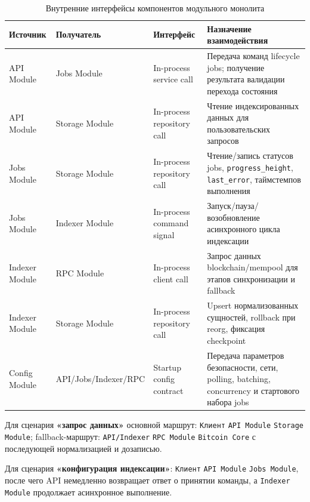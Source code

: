 ﻿\documentclass[14pt,a4paper]{extarticle}
\begin{document}
\begin{table}[H]
\centering
\begin{tabular}{p{} p{} p{} p{}}
\toprule
Источник & Получатель & Интерфейс & Назначение взаимодействия \\
\midrule
API Module & Jobs Module & In-process service call & Передача команд lifecycle jobs; получение результата валидации перехода состояния \\
\midrule
API Module & Storage Module & In-process repository call & Чтение индексированных данных для пользовательских запросов \\
\midrule
Jobs Module & Storage Module & In-process repository call & Чтение/запись статусов jobs, \texttt{progress\_height}, \texttt{last\_error}, таймстемпов выполнения \\
\midrule
Jobs Module & Indexer Module & In-process command signal & Запуск/пауза/возобновление асинхронного цикла индексации \\
\midrule
Indexer Module & RPC Module & In-process client call & Запрос данных blockchain/mempool для этапов синхронизации и fallback \\
\midrule
Indexer Module & Storage Module & In-process repository call & Upsert нормализованных сущностей, rollback при reorg, фиксация checkpoint \\
\midrule
Config Module & API/Jobs/Indexer/RPC & Startup config contract & Передача параметров безопасности, сети, polling, batching, concurrency и стартового набора jobs \\
\bottomrule
\end{tabular}
\caption{Внутренние интерфейсы компонентов модульного монолита}
\end{table}

\noindent Для сценария \textbf{«запрос данных»} основной маршрут: \texttt{Клиент} \textrightarrow{} \texttt{API Module} \textrightarrow{} \texttt{Storage Module}; fallback-маршрут: \texttt{API/Indexer} \textrightarrow{} \texttt{RPC Module} \textrightarrow{} \texttt{Bitcoin Core} с последующей нормализацией и дозаписью.

\noindent Для сценария \textbf{«конфигурация индексации»}: \texttt{Клиент} \textrightarrow{} \texttt{API Module} \textrightarrow{} \texttt{Jobs Module}, после чего API немедленно возвращает ответ о принятии команды, а \texttt{Indexer Module} продолжает асинхронное выполнение.
\end{document}
